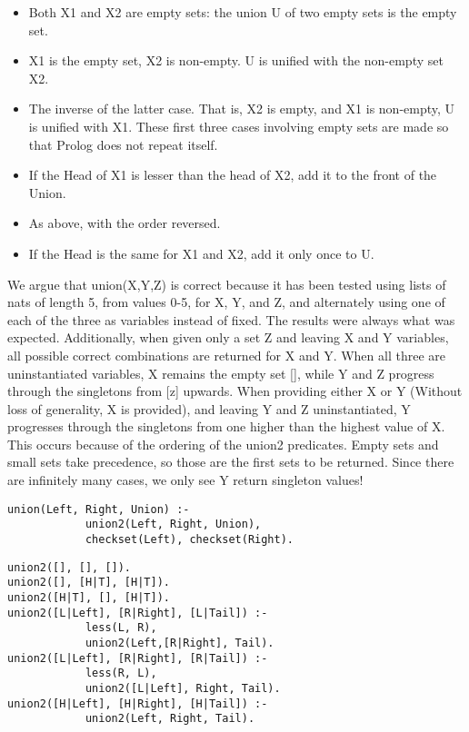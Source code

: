 \documentclass{article}
\begin{document}
\begin{itemize}

    \item Both X1 and X2 are empty sets: the union U of two empty sets is the empty set.

    \item X1 is the empty set, X2 is non-empty. U is unified with the non-empty set X2.

    \item The inverse of the latter case. That is, X2 is empty, and X1 is non-empty, U is unified with X1. These first three cases involving empty sets are made so that Prolog does not repeat itself.

    \item If the Head of X1 is lesser than the head of X2, add it to the front of the Union.

    \item As above, with the order reversed.

    \item If the Head is the same for X1 and X2, add it only once to U.

\end{itemize}
We argue that union(X,Y,Z) is correct because it has been tested using lists of nats of length 5, from values 0-5, for X, Y, and Z, and alternately using one of each of the three as variables instead of fixed. The results were always what was expected. Additionally, when given only a set Z and leaving X and Y variables, all possible correct combinations are returned for X and Y. When all three are uninstantiated variables, X remains the empty set [], while Y and Z progress through the singletons from [z] upwards. When providing either X or Y (Without loss of generality, X is provided), and leaving Y and Z uninstantiated, Y progresses through the singletons from one higher than the highest value of X. This occurs because of the ordering of the union2 predicates. Empty sets and small sets take precedence, so those are the first sets to be returned. Since there are infinitely many cases, we only see Y return singleton values!
\lstset{language=Prolog, frame=lines} \begin{lstlisting}[caption={union/3 definition}]
union(Left, Right, Union) :- 
            union2(Left, Right, Union),
            checkset(Left), checkset(Right).
\end{lstlisting}
\lstset{language=Prolog, frame=lines} \begin{lstlisting}[caption={union2/3 definition}]
union2([], [], []).
union2([], [H|T], [H|T]).
union2([H|T], [], [H|T]).
union2([L|Left], [R|Right], [L|Tail]) :- 
            less(L, R),
            union2(Left,[R|Right], Tail).
union2([L|Left], [R|Right], [R|Tail]) :- 
            less(R, L),
            union2([L|Left], Right, Tail).
union2([H|Left], [H|Right], [H|Tail]) :- 
            union2(Left, Right, Tail).
\end{lstlisting}
\end{document}
